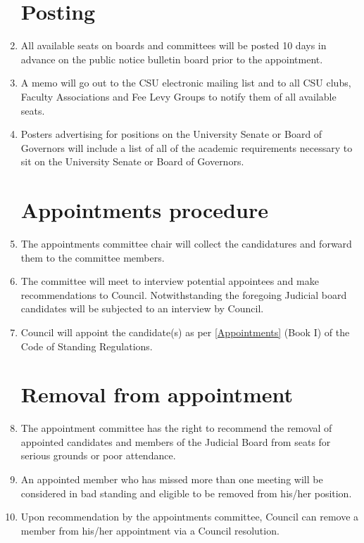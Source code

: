 \documentclass[oneside]{book}
\begin{document}
\begin{enumerate}
\section{\label{Posting}Posting }
\item All available seats on boards and committees will be posted 10 days
in advance on the public notice bulletin board prior to the appointment. 
\item A memo will go out to the CSU electronic mailing list and to all CSU
clubs, Faculty Associations and Fee Levy Groups to notify them of
all available seats. 
\item Posters advertising for positions on the University Senate or Board
of Governors will include a list of all of the academic requirements
necessary to sit on the University Senate or Board of Governors. 

\section{\label{Appointments_procedure}Appointments procedure }
\item The appointments committee chair will collect the candidatures and
forward them to the committee members. 
\item The committee will meet to interview potential appointees and make
recommendations to Council. Notwithstanding the foregoing Judicial
board candidates will be subjected to an interview by Council. 
\item Council will appoint the candidate(s) as per \autoref{Appointments} (Book I) of the Code
of Standing Regulations. 

\section{\label{Removal_from_appointment}Removal from appointment }
\item The appointment committee has the right to recommend the removal of
appointed candidates and members of the Judicial Board from seats
for serious grounds or poor attendance. 
\item An appointed member who has missed more than one meeting will be considered
in bad standing and eligible to be removed from his/her position. 
\item Upon recommendation by the appointments committee, Council can remove
a member from his/her appointment via a Council resolution. 


\end{enumerate}
\end{document}
